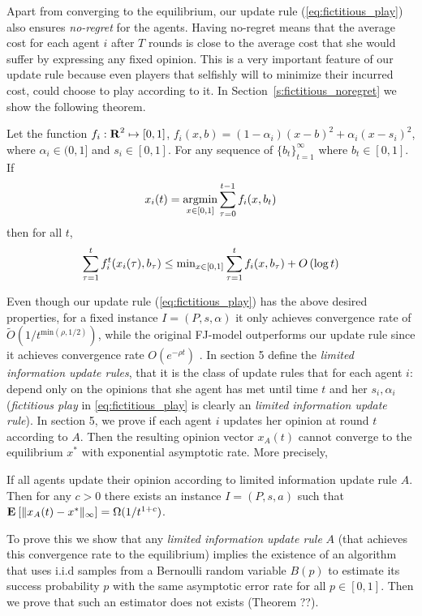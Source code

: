 Apart from converging to the equilibrium, our update rule
(\ref{eq:fictitious_play}) also ensures \emph{no-regret} for the agents.
Having no-regret means that the average cost for each agent $i$
after $T$ rounds is close to the average cost that she would
suffer by expressing any fixed opinion. This is a very important
feature of our update rule because even players that selfishly
will to minimize their incurred cost, could choose to play according
to it. In Section~\ref{s:fictitious_noregret} we show the following
theorem.

\begin{theorem}\label{t:fictitious_noregret}
Let the function $f_i:\bm{\mathrm{R}}^2 \mapsto [0,1]$, $f_i(x,b) = (1-\alpha_i)(x-b)^2 + \alpha_i(x-s_i)^2$, where $\alpha_i \in (0,1]$ and $s_i \in [0,1]$.
For any sequence of $\{b_t\}_{t=1}^\infty$ where $b_t \in [0,1]$. If 
\[x_i(t) = \operatorname*{argmin}_{x \in [0,1]}\sum_{\tau=0}^{t-1}f_i(x,b_t)\] then for all $t$,
\[\sum_{\tau=1}^tf_i^t(x_i(\tau),b_\tau) \leq \text{min}_{x \in [0,1]}\sum_{\tau=1}^tf_i(x,b_\tau) + O\left(\log t\right)\]
\end{theorem}

Even though our update rule (\ref{eq:fictitious_play}) has the above
desired properties, for a fixed instance $I=(P,s,\alpha)$ it only achieves convergence rate of
$\widetilde{O}(1/t^{\text{min}(\rho,1/2)})$, while the original FJ-model outperforms
our update rule since it achieves convergence rate $O(e^{-\rho t})$ \cite{GS14}.
In section 5 define the \emph{limited information update rules}, that it is the class
of update rules that for each agent $i$: depend only on the opinions that she agent has met
until time $t$ and her $s_i,\alpha_i$ (\emph{fictitious play} in \ref{eq:fictitious_play} 
is clearly an \emph{limited information update rule}).
In section 5, we prove if each agent $i$ updates her 
opinion at round $t$ according to $A$. Then the resulting opinion vector $x_A(t)$ cannot converge to the equilibrium $x^*$ 
with exponential asymptotic rate. More precisely,
\begin{theorem}\label{thm:lower_bound}
If all agents update their opinion according to limited information update rule $A$. Then for any $c>0$ there
exists an instance $I=(P,s,a)$ such that $\Exp{\norm{\infty}{x_A(t) - x^*}} = \Omega(1/t^{1+c})$.
\end{theorem}

To prove this we show that any \emph{limited information update rule} $A$
(that achieves this convergence rate to the equilibrium) implies
the existence of an algorithm that uses i.i.d samples from a Bernoulli random
variable $B(p)$ to estimate its success probability $p$ with the same asymptotic
error rate for all $p \in [0,1]$. Then we prove that such an estimator does not exists (Theorem ??).


